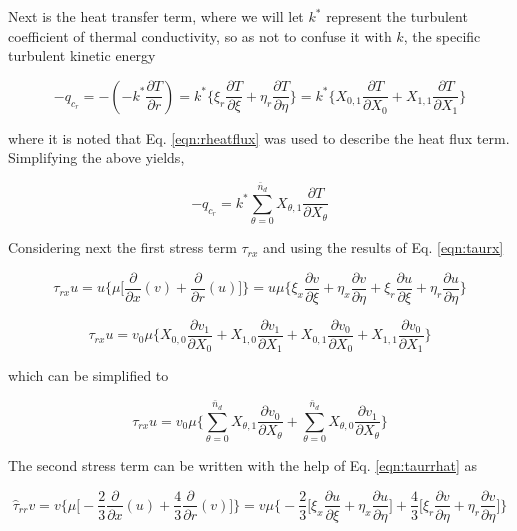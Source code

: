 	Next is the heat transfer term, where we will let $k^*$ represent the turbulent coefficient of
thermal conductivity, so as not to confuse it with $k$, the specific turbulent kinetic energy

\begin{displaymath}
	- q_{c_r} = -(-k^* \frac{\partial T}{\partial r}) = k^* \Big\{\xi_r \frac{\partial T}{\partial \xi}
	+ \eta_r \frac{\partial T}{\partial \eta}\Big\} = k^*\Big\{X_{0,1} \frac{\partial T}{\partial X_0}
	+ X_{1,1} \frac{\partial T}{\partial X_1}\Big\}
\end{displaymath}

	where it is noted that Eq. \ref{eqn:rheatflux} was used to describe the heat flux term.  Simplifying
the above yields,

\begin{equation}
	- q_{c_r} = k^*\sum_{\theta = 0}^{\bar{n}_d} X_{\theta,1} \frac{\partial T}{\partial X_\theta}
\label{eqn:energyB}
\end{equation}
	
	Considering next the first stress term $\tau_{rx}$ and using the results of Eq. \ref{eqn:taurx}

\begin{displaymath}
	\tau_{rx}u = u\Big\{\mu\Big[\frac{\partial}{\partial x}(v) + \frac{\partial}{\partial r}(u)\Big]\Big\} =
	u\mu\Big\{\xi_x \frac{\partial v}{\partial \xi} + \eta_x \frac{\partial v}{\partial \eta} +
	\xi_r \frac{\partial u}{\partial \xi} + \eta_r \frac{\partial u}{\partial \eta} \Big\} 
\end{displaymath}

\begin{displaymath}
	\tau_{rx}u = 
	v_0 \mu \Big\{X_{0,0} \frac{\partial v_1}{\partial X_0} + X_{1,0} \frac{\partial v_1}{\partial X_1} +
	X_{0,1} \frac{\partial v_0}{\partial X_0} + X_{1,1} \frac{\partial v_0}{\partial X_1} \Big\}
\end{displaymath}

	which can be simplified to

\begin{equation}
	\tau_{rx}u = v_0\mu
	\Big\{\sum_{\theta = 0}^{\bar{n}_d} X_{\theta,1}\frac{\partial v_0}{\partial X_\theta} +
	\sum_{\theta = 0}^{\bar{n}_d} X_{\theta,0}\frac{\partial v_1}{\partial X_\theta}\Big\}
\label{eqn:energyC}
\end{equation}

	The second stress term can be written with the help of Eq. \ref{eqn:taurrhat} as
	
\begin{displaymath}
	\hat{ \tau}_{rr}v = v\Big\{\mu\Big[ -\frac{2}{3} \frac{\partial}{\partial x}(u) 
	+ \frac{4}{3} \frac{\partial}{\partial r}(v)\Big]\Big\} = v\mu\Big\{-\frac{2}{3}\Big[
	\xi_x\frac{\partial u}{\partial \xi} + \eta_x\frac{\partial u}{\partial \eta}\Big] + \frac{4}{3}\Big[
	\xi_r\frac{\partial v}{\partial \eta} + \eta_r\frac{\partial v}{\partial \eta}\Big] \Big\}
\end{displaymath}

